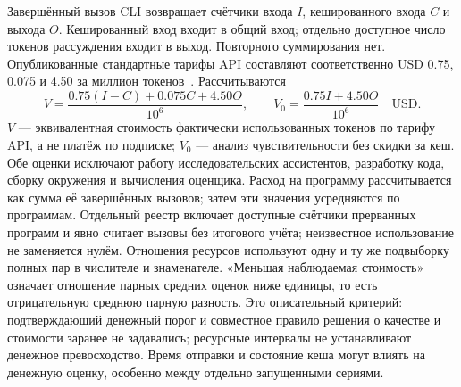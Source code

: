Завершённый вызов CLI возвращает счётчики входа $I$, кешированного входа $C$ и выхода $O$. Кешированный вход входит в общий вход; отдельно доступное число токенов рассуждения входит в выход. Повторного суммирования нет. Опубликованные стандартные тарифы API составляют соответственно USD 0.75, 0.075 и 4.50 за миллион токенов~\cite{openaipricing2026}. Рассчитываются
\begin{equation}
V=\frac{0.75(I-C)+0.075C+4.50O}{10^6},\qquad
V_0=\frac{0.75I+4.50O}{10^6}\quad\mathrm{USD}.
\end{equation}
$V$ --- эквивалентная стоимость фактически использованных токенов по тарифу API, а не платёж по подписке; $V_0$ --- анализ чувствительности без скидки за кеш. Обе оценки исключают работу исследовательских ассистентов, разработку кода, сборку окружения и вычисления оценщика. Расход на программу рассчитывается как сумма её завершённых вызовов; затем эти значения усредняются по программам. Отдельный реестр включает доступные счётчики прерванных программ и явно считает вызовы без итогового учёта; неизвестное использование не заменяется нулём. Отношения ресурсов используют одну и ту же подвыборку полных пар в числителе и знаменателе. «Меньшая наблюдаемая стоимость» означает отношение парных средних оценок ниже единицы, то есть отрицательную среднюю парную разность. Это описательный критерий: подтверждающий денежный порог и совместное правило решения о качестве и стоимости заранее не задавались; ресурсные интервалы не устанавливают денежное превосходство. Время отправки и состояние кеша могут влиять на денежную оценку, особенно между отдельно запущенными сериями.
